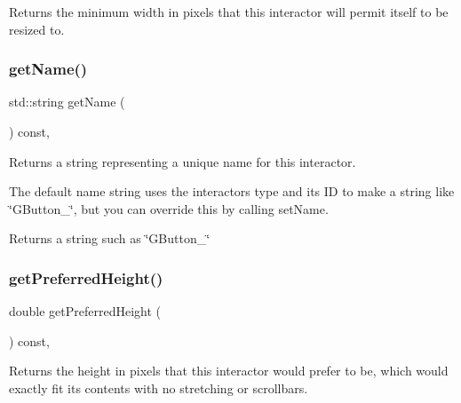 Returns the minimum width in pixels that this interactor will permit itself to be resized to. 

\mbox{\label{classsgl_1_1GInteractor_a8a60438a5b55d0b2ceb35c8674b9d8c5}} 
\subsubsection{\texorpdfstring{get\+Name()}{getName()}}
{\footnotesize\ttfamily std\+::string get\+Name (\begin{DoxyParamCaption}{ }\end{DoxyParamCaption}) const\hspace{0.3cm}{\ttfamily [virtual]}, {\ttfamily [inherited]}}



Returns a string representing a unique name for this interactor. 

The default name string uses the interactor\textquotesingle{}s type and its ID to make a string like \char`\"{}\+G\+Button\+\_\char`\"{}, but you can override this by calling set\+Name. \begin{DoxyReturn}{Returns}
a string such as \char`\"{}\+G\+Button\+\_\char`\"{} 
\end{DoxyReturn}
\mbox{\label{classsgl_1_1GInteractor_a747de0961653847bdc6615dbf756d715}} 
\subsubsection{\texorpdfstring{get\+Preferred\+Height()}{getPreferredHeight()}}
{\footnotesize\ttfamily double get\+Preferred\+Height (\begin{DoxyParamCaption}{ }\end{DoxyParamCaption}) const\hspace{0.3cm}{\ttfamily [virtual]}, {\ttfamily [inherited]}}



Returns the height in pixels that this interactor would prefer to be, which would exactly fit its contents with no stretching or scrollbars. 


